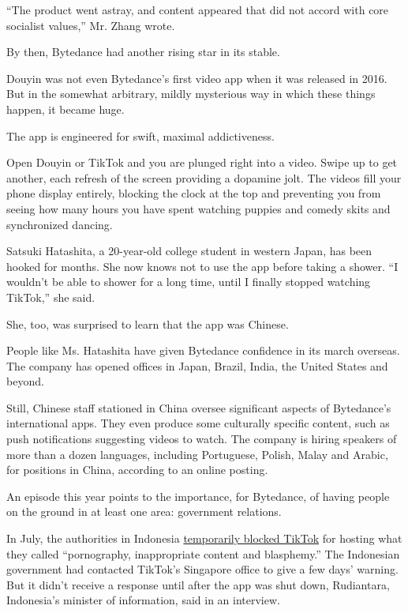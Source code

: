``The product went astray, and content appeared that did not accord with
core socialist values,'' Mr. Zhang wrote.

By then, Bytedance had another rising star in its stable.

Douyin was not even Bytedance's first video app when it was released in
2016. But in the somewhat arbitrary, mildly mysterious way in which
these things happen, it became huge.

The app is engineered for swift, maximal addictiveness.

Open Douyin or TikTok and you are plunged right into a video. Swipe up
to get another, each refresh of the screen providing a dopamine jolt.
The videos fill your phone display entirely, blocking the clock at the
top and preventing you from seeing how many hours you have spent
watching puppies and comedy skits and synchronized dancing.

Satsuki Hatashita, a 20-year-old college student in western Japan, has
been hooked for months. She now knows not to use the app before taking a
shower. ``I wouldn't be able to shower for a long time, until I finally
stopped watching TikTok,'' she said.

She, too, was surprised to learn that the app was Chinese.

People like Ms. Hatashita have given Bytedance confidence in its march
overseas. The company has opened offices in Japan, Brazil, India, the
United States and beyond.

Still, Chinese staff stationed in China oversee significant aspects of
Bytedance's international apps. They even produce some culturally
specific content, such as push notifications suggesting videos to watch.
The company is hiring speakers of more than a dozen languages, including
Portuguese, Polish, Malay and Arabic, for positions in China, according
to an online posting.

An episode this year points to the importance, for Bytedance, of having
people on the ground in at least one area: government relations.

In July, the authorities in Indonesia
\href{http://www.thejakartapost.com/news/2018/07/03/what-is-tik-tok-an-app-blocked-before-we-older-people-even-heard-of-it.html}{temporarily
blocked TikTok} for hosting what they called ``pornography,
inappropriate content and blasphemy.'' The Indonesian government had
contacted TikTok's Singapore office to give a few days' warning. But it
didn't receive a response until after the app was shut down, Rudiantara,
Indonesia's minister of information, said in an interview.

